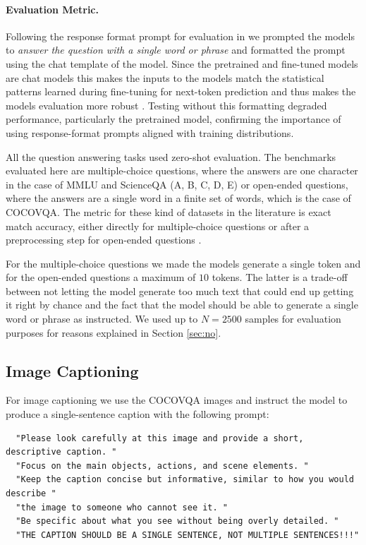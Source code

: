 \paragraph{Evaluation Metric.}

Following the response format prompt for evaluation in \cite{liuImprovedBaselinesVisual2024} we prompted the models to \textit{answer the question with a single word or phrase} and formatted the prompt using the chat template of the model. Since the pretrained and fine-tuned models are chat models this makes the inputs to the models match the statistical patterns learned during fine-tuning for next-token prediction and thus makes the models evaluation more robust \cite{heDoesPromptFormatting2024, weiChainofThoughtPromptingElicits2023}. Testing without this formatting degraded performance, particularly the pretrained model, confirming the importance of using response-format prompts aligned with training distributions.

All the question answering tasks used zero-shot evaluation. The benchmarks evaluated here are multiple-choice questions, where the answers are one character in the case of MMLU and ScienceQA (A, B, C, D, E) or open-ended questions, where the answers are a single word in a finite set of words, which is the case of COCOVQA. The metric for these kind of datasets in the literature is exact match accuracy, either directly for multiple-choice questions or after a preprocessing step for open-ended questions \cite{renExploringModelsData2015, luHierarchicalQuestionImageCoAttention2017, liuImprovedBaselinesVisual2024}.

For the multiple-choice questions we made the models generate a single token and for the open-ended questions a maximum of $10$ tokens. The latter is a trade-off between not letting the model generate too much text that could end up getting it right by chance and the fact that the model should be able to generate a single word or phrase as instructed. We used up to $N=2500$ samples for evaluation purposes for reasons explained in Section \ref{sec:no}.

\subsection{Image Captioning} \label{sec:image_captioning}

For image captioning we use the COCOVQA images and instruct the model to produce a single-sentence caption with the following prompt:

{\small
\begin{verbatim}
  "Please look carefully at this image and provide a short, descriptive caption. "
  "Focus on the main objects, actions, and scene elements. "
  "Keep the caption concise but informative, similar to how you would describe "
  "the image to someone who cannot see it. "
  "Be specific about what you see without being overly detailed. "
  "THE CAPTION SHOULD BE A SINGLE SENTENCE, NOT MULTIPLE SENTENCES!!!"
\end{verbatim}
}

